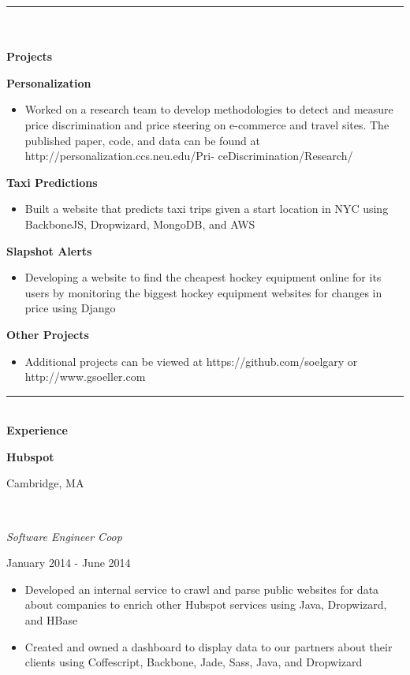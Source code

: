 \documentclass[14pt]{article}
\newcommand\textboxhalf[1]{%
  \parbox{.5\textwidth}{#1}%
}
\begin{document}
\noindent\rule{19.0cm}{0.4pt}
\\
\\
\noindent\textbf{\Large{Projects}}
\\
\noindent\textboxhalf{\textbf{Personalization}}\textboxhalf{\hfill}
\begin{itemize} [noitemsep, nolistsep]
\item Worked on a research team to develop methodologies to detect and measure price discrimination and price steering on e-commerce and travel sites. The published paper, code, and data can be found at http://personalization.ccs.neu.edu/Pri-
ceDiscrimination/Research/
\end{itemize}

\noindent\textboxhalf{\textbf{Taxi Predictions}}\textboxhalf{\hfill}
\begin{itemize} [noitemsep, nolistsep]
\item Built a website that predicts taxi trips given a start location in NYC using BackboneJS, Dropwizard, MongoDB, and AWS
\end{itemize}


\noindent\textboxhalf{\textbf{Slapshot Alerts}}\textboxhalf{\hfill}
\begin{itemize} [noitemsep, nolistsep]
\item Developing a website to find the cheapest hockey equipment online for its users by monitoring the biggest hockey equipment websites for changes in price using Django
\end{itemize}

\noindent\textboxhalf{\textbf{Other Projects}}\textboxhalf{\hfill}
\begin{itemize} [noitemsep, nolistsep]
\item Additional projects can be viewed at https://github.com/soelgary or http://www.gsoeller.com
\end{itemize}



\noindent\rule{19.0cm}{0.4pt}
\\

\noindent\textbf{\Large{Experience}}
\\
\noindent\textboxhalf{\textbf{Hubspot\hfill}}\textboxhalf{\hfill Cambridge, MA}
\\
\noindent\textboxhalf{\textit{Software Engineer Coop}\hfill}\textboxhalf{\hfill January 2014 - June 2014}
\begin{itemize} [noitemsep, nolistsep]
\item Developed an internal service to crawl and parse public websites for data about companies to enrich other Hubspot services using Java, Dropwizard, and HBase
\item Created and owned a dashboard to display data to our partners about their clients using Coffescript, Backbone, Jade, Sass, Java, and Dropwizard
\end{itemize}
\end{document}
